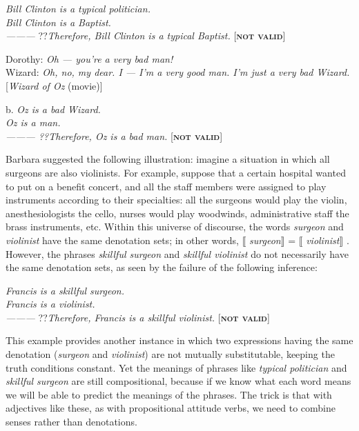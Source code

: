 \ea
\textit{Bill Clinton is a typical politician.}\\
\textit{Bill Clinton is a Baptist.\\
———\FelixHRule
}??\textit{Therefore, Bill Clinton is a typical Baptist.}   [\textbf{\textsc{not valid}}]
\z

\ea
\ea  Dorothy: \textit{Oh — you’re a very bad man!}\\
Wizard: \textit{Oh, no, my dear. I — I’m a very good man. I’m just a very bad Wizard.}\\
{}[\textit{Wizard of Oz} (movie)]
                       \z
\z

\ea
  b.  \textit{Oz is a bad Wizard.}\\
\textit{Oz is a man.\\
———\FelixHRule
??Therefore, Oz is a bad man.}   [\textbf{\textsc{not valid}}]
\z


Barbara \citet{Partee1995} suggested the following illustration: imagine a situation in which all surgeons are also violinists. For example, suppose that a certain hospital wanted to put on a benefit concert, and all the staff members were assigned to play instruments according to their specialties: all the surgeons would play the violin, anesthesiologists the cello, nurses would play woodwinds, administrative staff the brass instruments, etc. Within this universe of discourse, the words \textit{surgeon} and \textit{violinist} have the same denotation sets; in other words, $\llbracket$ \textit{surgeon}$\rrbracket$  = $\llbracket$ \textit{violinist}$\rrbracket$ . However, the phrases \textit{skillful surgeon} and \textit{skillful violinist} do not necessarily have the same denotation sets, as seen by the failure of the following inference:


\ea






  \textit{Francis is a skillful surgeon.}\\
\textit{Francis is a violinist.\\
———\FelixHRule
}??\textit{Therefore, Francis is a skillful violinist.}   [\textbf{\textsc{not valid}}]
\z


This example provides another instance in which two expressions having the same denotation (\textit{surgeon} and \textit{violinist}) are not mutually substitutable, keeping the truth conditions constant. Yet the meanings of phrases like \textit{typical politician} and \textit{skillful surgeon} are still compositional, because if we know what each word means we will be able to predict the meanings of the phrases. The trick is that with adjectives like these, as with propositional attitude verbs, we need to combine senses rather than denotations.



